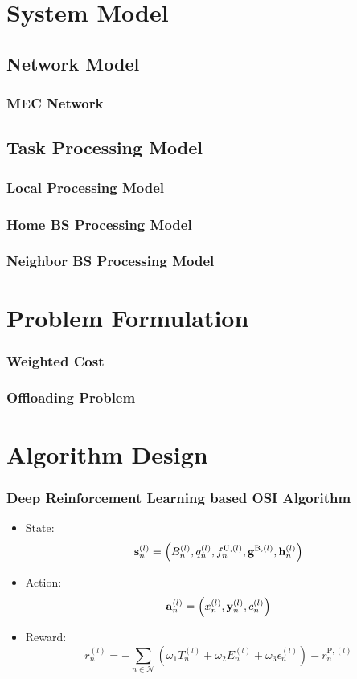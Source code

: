 \documentclass{beamer}
\begin{document}
	
	
	
	
	\section[System Model]{System Model}
	\subsection{Network Model}
	\begin{frame}
		\frametitle{MEC Network}
	\end{frame}
	
	
	\subsection{Task Processing Model}
	\begin{frame}
		\frametitle{Local Processing Model}
	\end{frame}
	
	
	\begin{frame}
		\frametitle{Home BS Processing Model}
	\end{frame}
	
	
	\begin{frame}
		\frametitle{Neighbor BS Processing Model}
	\end{frame}
	
	
	
	
	
	\section[Problem Formulation]{Problem Formulation}
	\begin{frame}
		\frametitle{Weighted Cost}
	\end{frame}


	\begin{frame}
		\frametitle{Offloading Problem}
	\end{frame}





	\section[Algorithm Design]{Algorithm Design}
	\begin{frame}
		\frametitle{Deep Reinforcement Learning based OSI Algorithm}
		\begin{itemize}
			\item State:
			$$
			\bold{s}_n^{(l)} = \left( B_n^{(l)}, q_n^{(l)}, f_n^{\text{U},(l)}, \bold{g}^{\text{B},(l)}, \bold{h}_n^{(l)} \right)
			$$
			\item Action:
			$$
			\bold{a}_n^{(l)} = \left( x_n^{(l)}, \bold{y}_{n}^{(l)}, c_n^{(l)} \right)
			$$
			\item Reward:
			$$
			r_n^{(l)} = -\sum_{n \in \mathcal{N}} \left( \omega_1 T_n^{(l)} + \omega_2 E_n^{(l)} + \omega_3 \epsilon_n^{(l)} \right)-r_n^{\text{P},(l)}
			$$
		\end{itemize}
	\end{frame}
\end{document}

